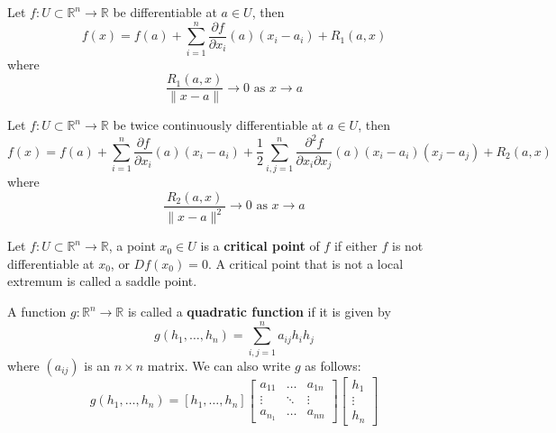 \documentclass[openany]{book}
\newcommand{\R}{\mathbb{R}}
\begin{document}
\begin{defn}
    Let $f:U\subset\R^n\to\R$ be differentiable at $a\in U$, then 
    \begin{equation*}
        f(x)=f(a)+\sum_{i=1}^n\frac{\partial f}{\partial x_i}(a)(x_i-a_i)+R_1(a,x)
    \end{equation*}
    where 
    \begin{equation*}
        \frac{R_1(a,x)}{\|x-a\|}\to 0 \text{ as } x\to a
    \end{equation*}
\end{defn}

\begin{defn}\label{taylor}
    Let $f:U\subset\R^n\to\R$ be twice continuously differentiable at $a\in U$, then 
    \begin{equation*}
        f(x)=f(a)+\sum_{i=1}^n\frac{\partial f}{\partial x_i}(a)(x_i-a_i)+\frac{1}{2}\sum_{i,j=1}^n\frac{\partial^2 f}{\partial x_i\partial x_j}(a)(x_i-a_i)(x_j-a_j)+R_2(a,x)
    \end{equation*}
    where 
    \begin{equation*}
        \frac{R_2(a,x)}{\|x-a\|^2}\to 0 \text{ as } x\to a
    \end{equation*}
\end{defn}

















\begin{defn}
    Let $f:U\subset\R^n\to\R$, a point $x_0\in U$ is a \textbf{critical point} of $f$ if either $f$ is not differentiable at $x_0$, or $Df(x_0)=0$. A critical point that is not a local extremum is called a saddle point.
\end{defn}

\begin{defn}
    A function $g:\R^n\to\R$ is called a \textbf{quadratic function} if it is given by 
    \begin{equation*}
        g(h_1,\dots, h_n)=\sum_{i,j=1}^na_{ij}h_ih_j
    \end{equation*}
    where $(a_{ij})$ is an $n\times n$ matrix. We can also write $g$ as follows:
    \begin{equation*}
        g(h_1,\dots,h_n)=[h_1,\dots,h_n]\begin{bmatrix}
            a_{11}&\dots &a_{1n}\\
            \vdots&\ddots &\vdots\\
            a_{n_1}&\dots&a_{nn}
        \end{bmatrix}\begin{bmatrix}
            h_1\\
            \vdots\\
            h_n
        \end{bmatrix}
    \end{equation*}

\end{defn}
\end{document}
